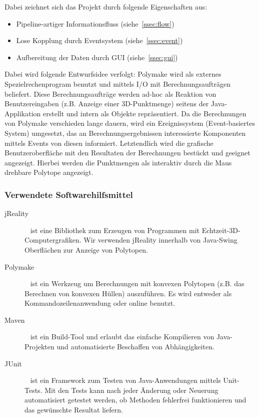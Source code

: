     Dabei zeichnet sich das Projekt durch folgende Eigenschaften aus:
    \begin{itemize}
        \item Pipeline-artiger Informationsfluss (siehe~\ref{ssec:flow})
        \item Lose Kopplung durch Eventsystem (siehe~\ref{ssec:event})
        \item Aufbereitung der Daten durch GUI (siehe~\ref{ssec:gui})
    \end{itemize}
    \noindent Dabei wird folgende Entwurfsidee verfolgt: Polymake wird als externes Spezielrechenprogram benutzt und mittels I/O mit Berechnungsaufträgen beliefert.
    Diese Berechnungsaufträge werden ad-hoc als Reaktion von Benutzereingaben (z.B. Anzeige einer 3D-Punktmenge) seitens der Java-Applikation erstellt und intern als
    Objekte repräsentiert. Da die Berechnungen von Polymake verschieden lange dauern, wird ein Ereignissystem (Event-basiertes System) umgesetzt, das an Berechnungsergebnissen
    interessierte Komponenten mittels Events von diesen informiert. Letztendlich wird die grafische Benutzeroberfläche mit den Resultaten der Berechnungen bestückt und
    geeignet angezeigt. Hierbei werden die Punktmengen als interaktiv durch die Maus drehbare Polytope angezeigt.

    \subsubsection{Verwendete Softwarehilfsmittel}
       \begin{description}
           \item [jReality]
                ~\cite{jreality} ist eine Bibliothek zum Erzeugen von Programmen mit Echtzeit-3D-Computergrafiken. Wir verwenden jReality innerhalb von Java-Swing Oberflächen zur Anzeige von Polytopen.
           \item [Polymake]
           	~\cite{polymake} ist ein Werkzeug um Berechnungen mit konvexen Polytopen (z.B. das Berechnen von konvexen Hüllen) auszuführen. Es wird entweder als Kommandozeilenanwendung oder online benutzt.
           \item [Maven]
                ~\cite{maven} ist ein Build-Tool und erlaubt das einfache Kompilieren von Java-Projekten und automatisierte Beschaffen von Abhängigkeiten.
           \item [JUnit]
                ~\cite{jUnit} ist ein Framework zum Testen von Java-Anwendungen mittels Unit-Tests. Mit den Tests kann nach jeder Änderung oder Neuerung automatisiert getestet werden, ob Methoden fehlerfrei funktionieren und das gewünschte Resultat liefern.
        \end{description}

